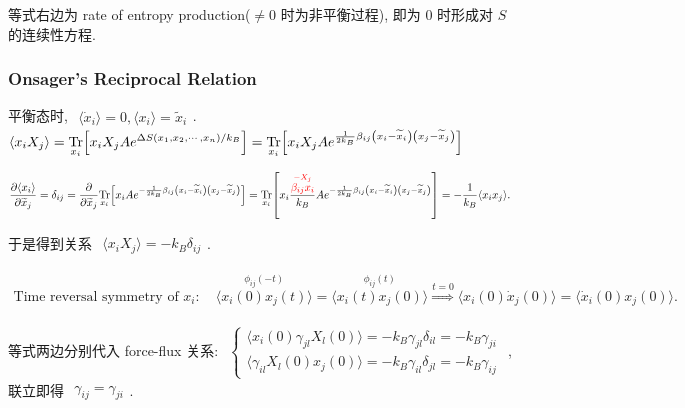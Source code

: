 \documentclass[../../main.tex]{subfiles}
\begin{document}
等式右边为 rate of entropy production($\neq 0$ 时为非平衡过程), 即为 0 时形成对 $S$ 的连续性方程. 

\subsubsection{Onsager's Reciprocal Relation}
平衡态时, $\begin{aligned}
    \langle \dot{x}_{i}\rangle = 0, \langle x_{i}\rangle = \widetilde{x}_{i}
\end{aligned}$. $\begin{aligned}
    \langle x_{i}X_{j}\rangle 
    = \underset{x_{i}}{\operatorname{Tr}}{\left[x_{i}X_{j}Ae^{\Delta S(x_{1},x_{2},\cdots,x_{n})/k_{B}}\right]} 
    = \underset{x_{i}}{\operatorname{Tr}}{\left[x_{i}X_{j}Ae^{\frac{1}{2k_{B}}\beta_{ij}\left(x_{i}-\widetilde{x}_{i}\right)\left(x_{j}-\widetilde{x}_{j}\right)}\right]}
\end{aligned}$

$\begin{aligned}
    \frac{\partial\langle x_{i}\rangle}{\partial \widetilde{x}_{j}} 
    = \delta_{ij} 
    = \frac{\partial}{\partial\widetilde{x}_{j}}
    \underset{x_{i}}{\operatorname{Tr}}
    {\left[
        x_{i}
        Ae^{-\frac{1}{2k_{B}}\beta_{ij}\left(x_{i}-\widetilde{x}_{i}\right)\left(x_{j}-\widetilde{x}_{j}\right)}
    \right]} 
    = \underset{x_{i}}{\operatorname{Tr}}
    {\left[
        x_{i}\frac{
            \stackrel{{\color{red}{-X_{j}}}}{{\color{red}{\beta_{ij}x_{i}}}}
            }{k_{B}}
        Ae^{-\frac{1}{2k_{B}}\beta_{ij}\left(x_{i}-\widetilde{x}_{i}\right)\left(x_{j}-\widetilde{x}_{j}\right)}
        \right]} = -\frac{1}{k_{B}}\langle x_{i}x_{j}\rangle. 
\end{aligned}$

于是得到关系 $\begin{aligned}
    \boxed{\langle x_{i}X_{j}\rangle = -k_{B}\delta_{ij}}
\end{aligned}$. 

$\begin{aligned}
    \text{Time reversal symmetry of }x_{i}: \quad\stackrel{\phi_{ij}(-t)}{\langle x_{i}(0)x_{j}(t)\rangle} = \stackrel{\phi_{ij}(t)}{\langle x_{i}(t)x_{j}(0)\rangle}\stackrel{t=0}{\Longrightarrow}\langle x_{i}(0)\dot{x}_{j}(0)\rangle = \langle\dot{x}_{i}(0)x_{j}(0)\rangle.
\end{aligned}$ 

等式两边分别代入 force-flux 关系: $\begin{aligned}
    \left\{\begin{aligned}
        \langle x_{i}(0)\gamma_{jl}X_{l}(0)\rangle = -k_{B}\gamma_{jl}\delta_{il} = -k_{B}\gamma_{ji}\\
        \langle\gamma_{il}X_{l}(0)x_{j}(0)\rangle = -k_{B}\gamma_{il}\delta_{jl} = -k_{B}\gamma_{ij}
    \end{aligned}\right.
\end{aligned}$, 联立即得 $\begin{aligned}
    \boxed{\gamma_{ij} = \gamma_{ji}}
\end{aligned}$. 
\end{document}
